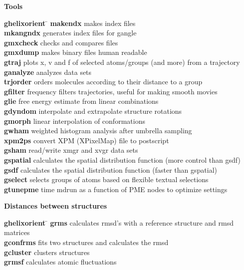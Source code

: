 \begin{description}
\item {\large\bf Tools}
\vspace{-2ex}\begin{tabbing}
{\bf g\us{}helixorient} \= \kill
{\bf make\us{}ndx} \> makes index files \\
{\bf mk\us{}angndx} \> generates index files for g\us{}angle \\
{\bf gmxcheck} \> checks and compares files \\
{\bf gmxdump} \> makes binary files human readable \\
{\bf g\us{}traj} \> plots x, v and f of selected atoms/groups (and more) from a trajectory \\
{\bf g\us{}analyze} \> analyzes data sets \\
{\bf trjorder} \> orders molecules according to their distance to a group \\
{\bf g\us{}filter} \> frequency filters trajectories, useful for making smooth movies \\
{\bf g\us{}lie} \> free energy estimate from linear combinations \\
{\bf g\us{}dyndom} \> interpolate and extrapolate structure rotations \\
{\bf g\us{}morph} \> linear interpolation of conformations  \\
{\bf g\us{}wham} \> weighted histogram analysis after umbrella sampling \\
{\bf xpm2ps} \> convert XPM (XPixelMap) file to postscript \\
{\bf g\us{}sham} \> read/write xmgr and xvgr data sets \\
{\bf g\us{}spatial} \> calculates the spatial distribution function (more control than g\us{}sdf) \\
{\bf g\us{}sdf} \> calculates the spatial distribution function (faster than g\us{}spatial) \\
{\bf g\us{}select} \> selects groups of atoms based on flexible textual selections \\
{\bf g\us{}tune\us{}pme} \> time mdrun as a function of PME nodes to optimize settings \\
\end{tabbing}\vspace{-2ex}

\item {\large\bf Distances between structures}
\vspace{-2ex}\begin{tabbing}
{\bf g\us{}helixorient} \= \kill
{\bf g\us{}rms} \> calculates rmsd's with a reference structure and rmsd matrices \\
{\bf g\us{}confrms} \> fits two structures and calculates the rmsd  \\
{\bf g\us{}cluster} \> clusters structures \\
{\bf g\us{}rmsf} \> calculates atomic fluctuations \\
\end{tabbing}\vspace{-2ex}


\end{description}
